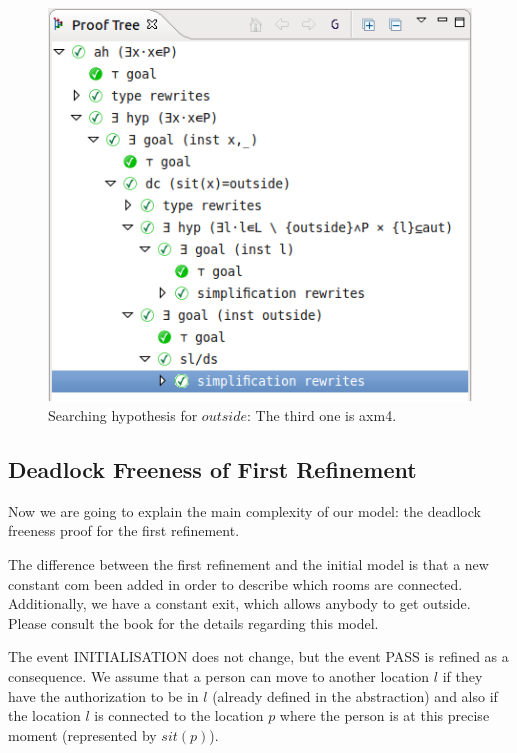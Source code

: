 \begin{figure}[!ht]
  \begin{center}
    \includegraphics{img/tutorial/tut_10_proof_tree_final.png}
    \caption{Searching hypothesis for $outside$: The third one is \textsf{axm4}.}
    \label{fig_tut_10_final_proof_tree}
  \end{center}
\end{figure}



\subsection{Deadlock Freeness of First Refinement}
\label{tut_location_first_refinement}

Now we are going to explain the main complexity of our model: the deadlock freeness proof for the first refinement. 


The difference between the first refinement and the initial model is that a new constant \textsf{com} been added in order to describe which rooms are connected. Additionally, we have a constant \textsf{exit}, which allows anybody to get outside.  Please consult the book for the details regarding this model.

The event \textsf{INITIALISATION} does not change, but the event \textsf{PASS} is refined as a consequence. We assume that a person can move to another location $l$ if they have the authorization to be in $l$ (already defined in the abstraction) and also if the location $l$ is connected to the location $p$ where the person is at this precise moment (represented by $sit(p)$).

